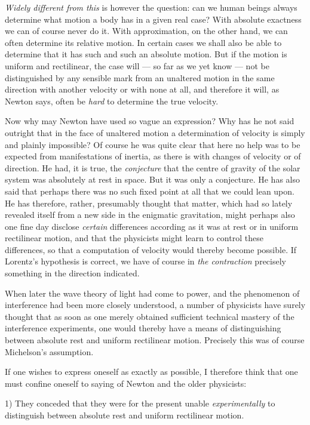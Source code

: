 \documentclass[12pt,a4paper]{article}
\begin{document}
\emph{Widely different from this} is however the question: can we human beings
always determine what motion a body has in a given real case? With absolute
exactness we can of course never do it. With approximation, on the other hand,
we can often determine its relative motion. In certain cases we shall also be
able to determine that it has such and such an absolute motion. But if the
motion is uniform and rectilinear, the case will --- so far as we yet know ---
not be distinguished by any sensible mark from an unaltered motion in the same
direction with another velocity or with none at all, and therefore it will, as
Newton says, often be \emph{hard} to determine the true velocity.

Now why may Newton have used so vague an expression? Why has he not said
outright that in the face of unaltered motion a determination of velocity is
simply and plainly impossible? Of course he was quite clear that here no help
was to be expected from manifestations of inertia, as there is with changes of
velocity or of direction. He had, it is true, the \emph{conjecture} that the
centre of gravity of the solar system was absolutely at rest in space. But it
was only a conjecture. He has also said that perhaps there was no such fixed
point at all that we could lean upon. He has therefore, rather, presumably
thought that matter, which had so lately revealed itself from a new side in
the enigmatic gravitation, might perhaps also one fine day disclose
\emph{certain} differences according as it was at rest or in uniform
rectilinear motion, and that the physicists might learn to control these
differences, so that a computation of velocity would thereby become possible.
If Lorentz's hypothesis is correct, we have of course in \emph{the contraction}
precisely something in the direction indicated.

When later the wave theory of light had come to power, and the phenomenon of
interference had been more closely understood, a number of physicists have
surely thought that as soon as one merely obtained sufficient technical
mastery of the interference experiments, one would thereby have a means of
distinguishing between absolute rest and uniform rectilinear motion. Precisely
this was of course Michelson's assumption.

If one wishes to express oneself as exactly as possible, I therefore think
that one must confine oneself to saying of Newton and the older physicists:

1) They conceded that they were for the present unable \emph{experimentally}
to distinguish between absolute rest and uniform rectilinear motion.
\end{document}
